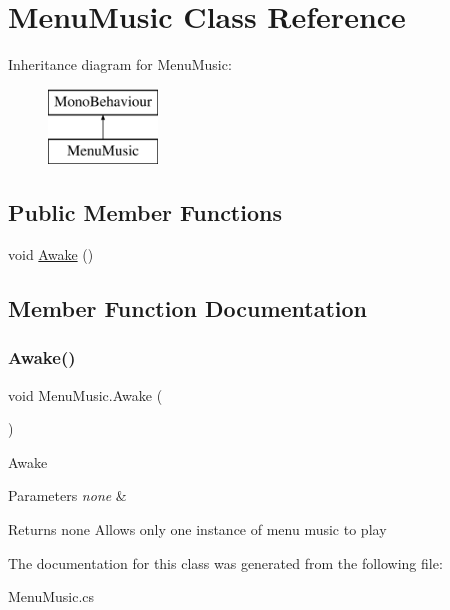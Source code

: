 \hypertarget{class_menu_music}{}\section{Menu\+Music Class Reference}
\label{class_menu_music}
Inheritance diagram for Menu\+Music\+:\begin{figure}[H]
\begin{center}
\leavevmode
\includegraphics[height=2.000000cm]{class_menu_music}
\end{center}
\end{figure}
\subsection*{Public Member Functions}
\begin{DoxyCompactItemize}
\item 
void \mbox{\hyperlink{class_menu_music_a821a3c7653b3dfee1e1fdf174857109d}{Awake}} ()
\end{DoxyCompactItemize}


\subsection{Member Function Documentation}
\mbox{\label{class_menu_music_a821a3c7653b3dfee1e1fdf174857109d}} 
\subsubsection{\texorpdfstring{Awake()}{Awake()}}
{\footnotesize\ttfamily void Menu\+Music.\+Awake (\begin{DoxyParamCaption}{ }\end{DoxyParamCaption})\hspace{0.3cm}{\ttfamily [inline]}}

Awake 
\begin{DoxyParams}{Parameters}
{\em none} & \\
\hline
\end{DoxyParams}
\begin{DoxyReturn}{Returns}
none Allows only one instance of menu music to play 
\end{DoxyReturn}


The documentation for this class was generated from the following file\+:\begin{DoxyCompactItemize}
\item 
Menu\+Music.\+cs\end{DoxyCompactItemize}
